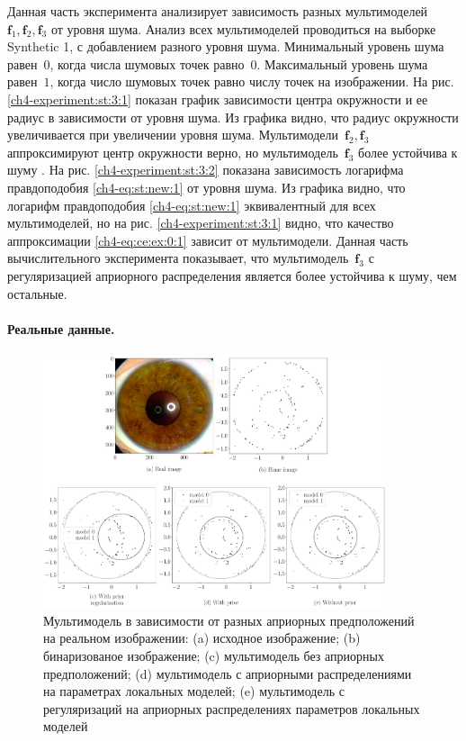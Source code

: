 Данная часть эксперимента анализирует зависимость разных мультимоделей~$\textbf{f}_1, \textbf{f}_2, \textbf{f}_3$ от уровня шума. 
Анализ всех мультимоделей проводиться на выборке Synthetic 1, с добавлением разного уровня шума.
Минимальный уровень шума равен~$0$, когда числа шумовых точек равно~$0$. Максимальный уровень шума равен~$1$, когда число шумовых точек равно числу точек на изображении.
На рис. \ref{ch4-experiment:st:3:1} показан график зависимости центра окружности и ее радиус в зависимости от уровня шума. Из графика видно, что радиус окружности увеличивается при увеличении уровня шума. 
Мультимодели~$\textbf{f}_2, \textbf{f}_3$ аппроксимируют центр окружности верно, но мультимодель~$\textbf{f}_3$ более устойчива к шуму .
На рис. \ref{ch4-experiment:st:3:2} показана зависимость логарифма правдоподобия \eqref{ch4-eq:st:new:1} от уровня шума. 
Из графика видно, что логарифм правдоподобия \eqref{ch4-eq:st:new:1} эквивалентный для всех мультимоделей, но на рис. \ref{ch4-experiment:st:3:1} видно, что качество аппроксимации \eqref{ch4-eq:ce:ex:0:1} зависит от мультимодели.
Данная часть вычислительного эксперимента показывает, что мультимодель~$\textbf{f}_3$ с регуляризацией априорного распределения является более устойчива к шуму, чем остальные.

\paragraph{Реальные данные.}
\begin{figure}[h!t]\center
\includegraphics[width=0.9\textwidth]{results/priorexpert/experiment_real_compare}
\caption{Мультимодель в зависимости от разных априорных предположений на реальном изображении: (a) исходное изображение; (b) бинаризованое изображение; (c) мультимодель без априорных предположений; (d) мультимодель с априорными распределениями на параметрах локальных моделей; (e) мультимодель с регуляризаций на априорных распределениях параметров локальных моделей}
\label{ch4-experiment:2}
\end{figure}

